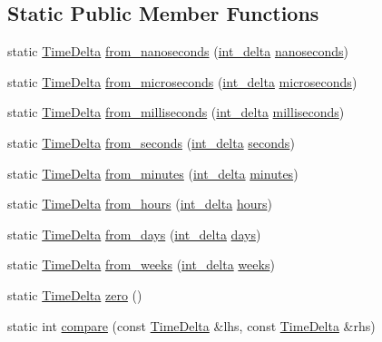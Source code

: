 \subsection*{\-Static \-Public \-Member \-Functions}
\begin{DoxyCompactItemize}
\item 
static \hyperlink{structTimeDelta}{\-Time\-Delta} \hyperlink{structTimeDelta_abc1b517c2156b2d9627fd07d42aecb2f}{from\-\_\-nanoseconds} (\hyperlink{types_8h_a8a67cf99971c5cfeeaa2380ba84a4c92}{int\-\_\-delta} \hyperlink{structTimeDelta_a27608357ea9addd1d0da20918f91d500}{nanoseconds})
\item 
static \hyperlink{structTimeDelta}{\-Time\-Delta} \hyperlink{structTimeDelta_a32f3fa21ba37d81507383d001f3b704b}{from\-\_\-microseconds} (\hyperlink{types_8h_a8a67cf99971c5cfeeaa2380ba84a4c92}{int\-\_\-delta} \hyperlink{structTimeDelta_aa23b22a3b2a0f3f559e9dc343588b546}{microseconds})
\item 
static \hyperlink{structTimeDelta}{\-Time\-Delta} \hyperlink{structTimeDelta_a01e0919f444379030aa37559fa13542c}{from\-\_\-milliseconds} (\hyperlink{types_8h_a8a67cf99971c5cfeeaa2380ba84a4c92}{int\-\_\-delta} \hyperlink{structTimeDelta_a185b2278844ed43b2f5e1e8d16b11cb2}{milliseconds})
\item 
static \hyperlink{structTimeDelta}{\-Time\-Delta} \hyperlink{structTimeDelta_aad4311d8580ade36d8c567576630c967}{from\-\_\-seconds} (\hyperlink{types_8h_a8a67cf99971c5cfeeaa2380ba84a4c92}{int\-\_\-delta} \hyperlink{structTimeDelta_aa1fe6d8a690ab04b561400c09db673ef}{seconds})
\item 
static \hyperlink{structTimeDelta}{\-Time\-Delta} \hyperlink{structTimeDelta_a244bc3b143bfa760aa2b0cf350cf768c}{from\-\_\-minutes} (\hyperlink{types_8h_a8a67cf99971c5cfeeaa2380ba84a4c92}{int\-\_\-delta} \hyperlink{structTimeDelta_a2856a4e761fc83822cc6987655035e76}{minutes})
\item 
static \hyperlink{structTimeDelta}{\-Time\-Delta} \hyperlink{structTimeDelta_a912f6ceafac4b9252a1a5d76033754ea}{from\-\_\-hours} (\hyperlink{types_8h_a8a67cf99971c5cfeeaa2380ba84a4c92}{int\-\_\-delta} \hyperlink{structTimeDelta_a5135596cbf7f7ef40001e25c5aa880b3}{hours})
\item 
static \hyperlink{structTimeDelta}{\-Time\-Delta} \hyperlink{structTimeDelta_a9bb1a85b6f27ad8488ae06e238d5808e}{from\-\_\-days} (\hyperlink{types_8h_a8a67cf99971c5cfeeaa2380ba84a4c92}{int\-\_\-delta} \hyperlink{structTimeDelta_abad8a94a6c022af1a1871e452eca47ea}{days})
\item 
static \hyperlink{structTimeDelta}{\-Time\-Delta} \hyperlink{structTimeDelta_ae0f0a41d899e62b9d17bc4542c443ec6}{from\-\_\-weeks} (\hyperlink{types_8h_a8a67cf99971c5cfeeaa2380ba84a4c92}{int\-\_\-delta} \hyperlink{structTimeDelta_a4e583a79abea664691df4680f4fd467d}{weeks})
\item 
static \hyperlink{structTimeDelta}{\-Time\-Delta} \hyperlink{structTimeDelta_a2dec837a107c5e46e14b9c69557209fa}{zero} ()
\item 
static int \hyperlink{structTimeDelta_a1bee789870de5a374ee472ffa4bff172}{compare} (const \hyperlink{structTimeDelta}{\-Time\-Delta} \&lhs, const \hyperlink{structTimeDelta}{\-Time\-Delta} \&rhs)
\end{DoxyCompactItemize}
